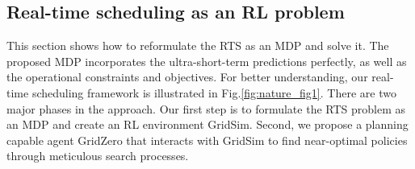 

\subsection*{Real-time scheduling as an RL problem}
This section shows how to reformulate the RTS as an MDP and solve it. The proposed MDP incorporates the ultra-short-term predictions perfectly, as well as the operational constraints and objectives.
For better understanding, our real-time scheduling framework is illustrated in Fig.\ref{fig:nature_fig1}. There are two major phases in the approach. Our first step is to formulate the RTS problem as an MDP and create an RL environment GridSim. Second, we propose a planning capable agent GridZero that interacts with GridSim to find near-optimal policies 
through meticulous search processes.
